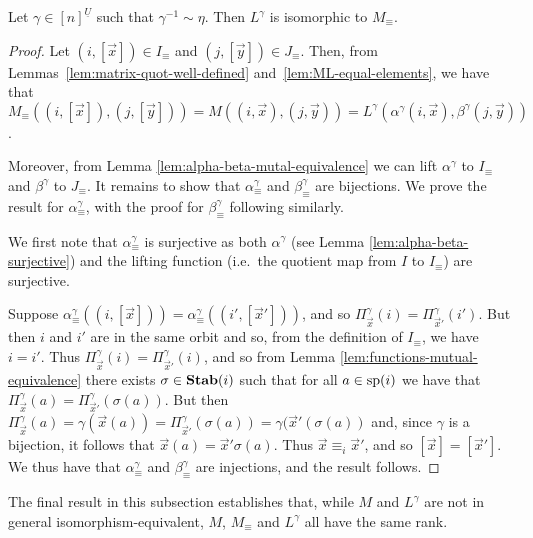\documentclass[../paper.tex]{subfiles}
\begin{document}
\begin{thm}
	Let $\gamma \in [n]^{\underline{U}}$ such that $\gamma^{-1} \sim \eta$. Then
  $L^{\gamma}$ is isomorphic to $M_{\equiv}$.
	\label{thm:LM-equivalence}
\end{thm}
\begin{proof}
	Let $(i, [\vec{x}]) \in I_\equiv$ and $(j, [\vec{y}]) \in J_\equiv$. Then,
  from Lemmas~\ref{lem:matrix-quot-well-defined}
  and~\ref{lem:ML-equal-elements}, we have that $M_\equiv ((i, [\vec{x}]), (j,
  [\vec{y}])) = M ((i, \vec{x}), (j, \vec{y})) = L^{\gamma}(\alpha^{\gamma}(i,
  \vec{x}), \beta^{\gamma}(j, \vec{y}))$.
		
	Moreover, from Lemma \ref{lem:alpha-beta-mutal-equivalence} we can lift
  $\alpha^\gamma$ to $I_\equiv$ and $\beta^{\gamma}$ to $J_\equiv$. It remains
  to show that $\alpha^\gamma_{\equiv}$ and $\beta^{\gamma}_{\equiv}$ are
  bijections. We prove the result for $\alpha^{\gamma}_{\equiv}$, with the proof
  for $\beta^\gamma_\equiv$ following similarly.
		
	We first note that $\alpha^{\gamma}_{\equiv}$ is surjective as both
  $\alpha^{\gamma}$ (see Lemma \ref{lem:alpha-beta-surjective}) and the lifting
  function (i.e.\ the quotient map from $I$ to $I_\equiv$) are surjective.
		
	Suppose $\alpha^{\gamma}_\equiv((i, [\vec{x}])) = \alpha^{\gamma}_\equiv((i',
  [\vec{x}']))$, and so $\Pi^{\gamma}_{\vec{x}}(i) =
  \Pi^{\gamma}_{\vec{x}'}(i')$. But then $i$ and $i'$ are in the same orbit and
  so, from the definition of $I_{\equiv}$, we have $i = i'$. Thus
  $\Pi^{\gamma}_{\vec{x}}(i) = \Pi^{\gamma}_{\vec{x}'}(i)$, and so from Lemma
  \ref{lem:functions-mutual-equivalence} there exists $\sigma \in \text{\textbf{Stab}}(i)$ such
  that for all $a \in \text{sp}(i)$ we have that $\Pi^{\gamma}_{\vec{x}}(a) =
  \Pi^{\gamma}_{\vec{x}'} (\sigma (a))$. But then $\Pi^{\gamma}_{\vec{x}}(a) =
  \gamma (\vec{x}(a)) = \Pi^{\gamma}_{\vec{x}'}(\sigma (a)) = \gamma (\vec{x}'
  (\sigma (a))$ and, since $\gamma$ is a bijection, it follows that $\vec{x}(a)
  = \vec{x}' \sigma (a)$. Thus $\vec{x} \equiv_i \vec{x}'$, and so $[\vec{x}] =
  [\vec{x}']$. We thus have that $\alpha^{\gamma}_\equiv$ and
  $\beta^{\gamma}_\equiv$ are injections, and the result follows.
\end{proof}

The final result in this subsection establishes that, while $M$ and $L^{\gamma}$
are not in general isomorphism-equivalent, $M$, $M_\equiv$ and $L^{\gamma}$ all
have the same rank.
\end{document}
